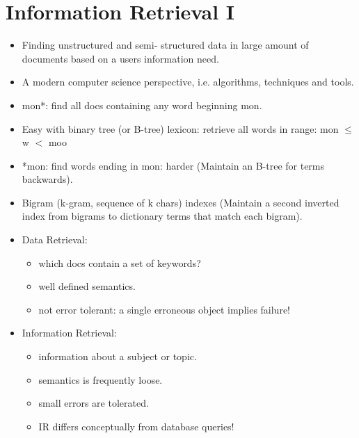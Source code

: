
\section{Information Retrieval I}

\begin{breakbox}
\begin{itemize}
	\item Finding unstructured and semi- structured data in large amount of documents based on a users information need.
	\item A modern computer science perspective, i.e. algorithms, techniques and tools.
\end{itemize}
\end{breakbox}

\begin{breakbox}

\end{breakbox}

\begin{breakbox}
\begin{itemize}
	\item mon*: find all docs containing any word beginning mon.
	\item Easy with binary tree (or B-tree) lexicon: retrieve all words in range: mon $\leq$ w $<$ moo
	\item *mon: find words ending in mon: harder (Maintain an B-tree for terms backwards).
	\item Bigram (k-gram, sequence of k chars) indexes (Maintain a second inverted index from bigrams to dictionary terms that match each bigram).
\end{itemize}

\end{breakbox}

\begin{breakbox}
\begin{itemize}
	\item Data Retrieval:
		\begin{itemize}
			\item which docs contain a set of keywords?
			\item well defined semantics.
			\item not error tolerant: a single erroneous object implies failure!
		\end{itemize}
	\item Information Retrieval:
		\begin{itemize}
			\item information about a subject or topic.
			\item semantics is frequently loose.
			\item small errors are tolerated.
			\item IR differs conceptually from database queries!
		\end{itemize}
\end{itemize}
\end{breakbox}


